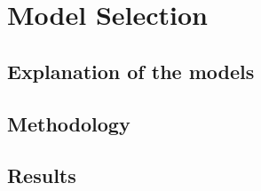 \section{Model Selection}

\subsection{Explanation of the models}
\subsection{Methodology}
\subsection{Results}